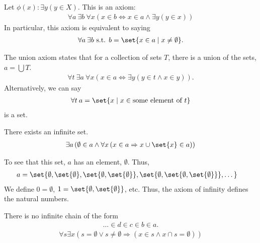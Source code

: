 \documentclass[10pt]{mypackage}
\begin{document}
\begin{example}
Let $\phi(x): \exists y\left(y\in X\right)$. This is an axiom:
\begin{align*}
  \forall a\:\exists b\:\forall x\left(x\in b \Leftrightarrow x\in a\wedge \exists y\left(y\in x\right)\right)
\end{align*}
In particular, this axiom is equivalent to saying
\begin{align*}
  \forall a\:\exists b\text{ s.t. }b = \set{x\in a\mid x\neq \emptyset}.
\end{align*}
\end{example}
\begin{axiom}[Union]
  The union axiom states that for a collection of sets $T$, there is a union of the sets, $a = \bigcup T$.
  \begin{align*}
    \forall t\:\exists a\:\forall x\left(x\in a \Leftrightarrow \exists y\left(y\in t\wedge x\in y\right)\right).
  \end{align*}
  Alternatively, we can say
  \begin{align*}
    \forall t\:a = \set{x\mid x\in \text{some element of }t}
  \end{align*}
  is a set.
\end{axiom}
\begin{axiom}[Infinity]
  There exists an infinite set.
  \begin{align*}
    \exists a\left(\emptyset\in a\wedge \forall x\left(x\in a \Rightarrow x \cup \set{x}\in a\right)\right)
  \end{align*}
\end{axiom}
\begin{remark}
  To see that this set, $a$ has an element, $\emptyset$. Thus,
  \begin{align*}
    a &= \set{\emptyset,\set{\emptyset},\set{\emptyset,\set{\emptyset}},\set{\emptyset,\set{\emptyset,\set{\emptyset}}},\dots}
  \end{align*}
  We define $0 = \emptyset$, $1 = \set{\emptyset,\set{\emptyset}}$, etc. Thus, the axiom of infinity defines the natural numbers.
\end{remark}
\begin{axiom}[Regularity]
  There is no infinite chain of the form
  \begin{align*}
    \dots\in d\in c\in b\in a.
  \end{align*}
  \begin{align*}
    \forall s\exists x\left(s = \emptyset \vee s\neq\emptyset \Rightarrow \left(x\in s\wedge x\cap s = \emptyset\right)\right)
  \end{align*}
\end{axiom}
\end{document}
